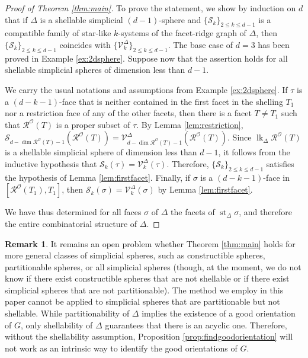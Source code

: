 \documentclass[11pt,twoside]{article}
\theoremstyle{definition}
\newtheorem*{remark*}{Remark}
\newcommand{\cS}{\mathcal{S}}
\newcommand{\cO}{\mathcal{O}}
\newcommand{\cV}{\mathcal{V}}
\newcommand{\cR}{\mathcal{R}}
\DeclareMathOperator{\st}{st}
\DeclareMathOperator{\lk}{lk}
\begin{document}
\begin{proof}[Proof of Theorem \ref{thm:main}]
To prove the statement, we show by induction on $d$ that if $\Delta$ is a shellable simplicial $(d-1)$-sphere and $\{\cS_k\}_{2 \le k \le d-1}$ is a compatible family of star-like $k$-systems of the facet-ridge graph of $\Delta$, then $\{\cS_k\}_{2 \le k \le d-1}$ coincides with $\{\cV^\Delta_k\}_{2 \le k \le d-1}$. The base case of $d = 3$ has been proved in Example \ref{ex:2dsphere}. Suppose now that the assertion holds for all shellable simplicial spheres of dimension less than $d-1$.
    
    We carry the usual notations and assumptions from Example \ref{ex:2dsphere}. If $\tau$ is a $(d-k-1)$-face that is neither contained in the first facet in the shelling $T_1$ nor a restriction face of any of the other facets, then there is a facet $T \ne T_1$ such that $\cR^\cO(T)$ is a proper subset of $\tau$. By Lemma \ref{lem:restriction}, $\cS_{d-\dim \cR^\cO(T)-1}(\cR^\cO(T)) = \cV^\Delta_{d-\dim \cR^\cO(T)-1}(\cR^\cO(T))$. Since $\lk_\Delta\cR^\cO(T)$ is a shellable simplicial sphere of dimension less than $d-1$, it follows from the inductive hypothesis that $\cS_k(\tau) = \cV^\Delta_k(\tau)$. Therefore, $\{\cS_k\}_{2 \le k \le d-1}$ satisfies the hypothesis of Lemma \ref{lem:firstfacet}. Finally, if $\sigma$ is a $(d-k-1)$-face in $[\cR^\cO(T_1), T_1]$, then $\cS_k(\sigma) = \cV^\Delta_k(\sigma)$ by Lemma \ref{lem:firstfacet}. 

    We have thus determined for all faces $\sigma$ of $\Delta$ the facets of $\st_\Delta \sigma$, and therefore the entire combinatorial structure of $\Delta$. 
\end{proof}

\begin{remark*}
It remains an open problem whether Theorem \ref{thm:main} holds for more general classes of simplicial spheres, such as constructible spheres, partitionable spheres, or all simplicial spheres (though, at the moment, we do not know if there exist constructible spheres that are not shellable or if there exist simplicial spheres that are not partitionable). The method we employ in this paper cannot be applied to simplicial spheres that are partitionable but not shellable. While partitionability of $\Delta$ implies the existence of a good orientation of $G$, only shellability of $\Delta$ guarantees that there is an acyclic one. Therefore, without the shellability assumption, Proposition \ref{prop:findgoodorientation} will not work as an intrinsic way to identify the good orientations of $G$. 
\end{remark*}
\end{document}
